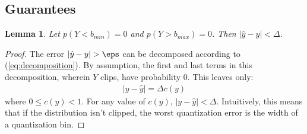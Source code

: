 \documentclass[]{article}
\newtheorem{lemma}{Lemma}[section]
\begin{document}
\subsection{Guarantees}



\begin{lemma} \label{thm:max_bin_err}
Let $p(Y < b_{min}) = 0$ and $p(Y > b_{max}) = 0$. Then $|\hat{y} - y| < \Delta$.
\end{lemma}

\begin{proof}
The error $|\hat{y} - y| > \eps$ can be decomposed according to (\ref{eq:decomposition}). By assumption, the first and last terms in this decomposition, wherein $Y$ clips, have probability 0. This leaves only:
\begin{align}
    |y - \hat{y}| = \Delta c(y)
\end{align}
where $0 \le c(y) < 1$. For any value of $c(y)$, $|y - \hat{y}| < \Delta$. Intuitively, this means that if the distribution isn't clipped, the worst quantization error is the width of a quantization bin.

\end{proof}
\end{document}
